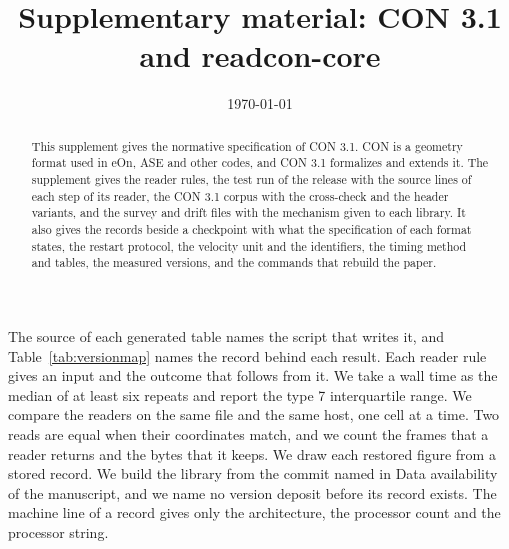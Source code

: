 \documentclass[preprint,12pt]{elsarticle}
\date{\today}
\title{Supplementary material: CON 3.1 and readcon-core}
\begin{document}

\begin{frontmatter}  \begin{abstract} This supplement gives the normative specification of CON 3.1.
CON is a geometry format used in eOn, ASE and other codes, and CON 3.1 formalizes and extends it.
The supplement gives the reader rules, the test run of the release with the source lines of each step of its reader, the CON 3.1 corpus with the cross-check and the header variants, and the survey and drift files with the mechanism given to each library.
It also gives the records beside a checkpoint with what the specification of each format states, the restart protocol, the velocity unit and the identifiers, the timing method and tables, the measured versions, and the commands that rebuild the paper.
\end{abstract} \end{frontmatter}

The source of each generated table names the script that writes it, and Table~\ref{tab:versionmap} names the record behind each result.
Each reader rule gives an input and the outcome that follows from it.
We take a wall time as the median of at least six repeats and report the type 7 interquartile range.
We compare the readers on the same file and the same host, one cell at a time.
Two reads are equal when their coordinates match, and we count the frames that a reader returns and the bytes that it keeps.
We draw each restored figure from a stored record.
We build the library from the commit named in Data availability of the manuscript, and we name no version deposit before its record exists.
The machine line of a record gives only the architecture, the processor count and the processor string.
\end{document}

